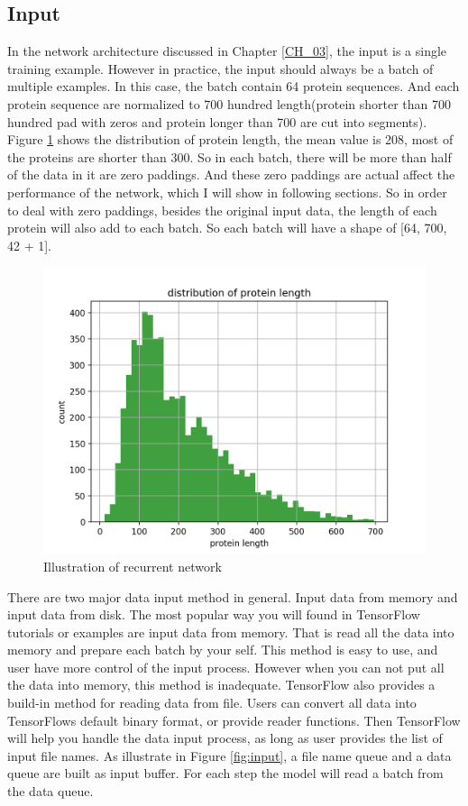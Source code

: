 \subsection{Input}
In the network architecture discussed in Chapter \ref{CH_03}, the input is a single training example. However in practice, the input should always be a batch of multiple examples. In this case, the batch contain 64 protein sequences. And each protein sequence are normalized to 700 hundred length(protein shorter than 700 hundred pad with zeros and protein longer than 700 are cut into segments).  Figure \ref{fig:len_dist} shows the distribution of protein length, the mean value is 208, most of the proteins are shorter than 300. So in each batch, there will be more than half of the data in it are zero paddings. And these zero paddings are actual affect the performance of the network, which I will show in following sections. So in order to deal with zero paddings, besides the original input data, the length of each protein will also add to each batch. So each batch will have a shape of [64, 700, 42 + 1].

\begin{figure}[H] 
	\centering
	\includegraphics[width=5in]{Figures/length_distribution}
	\caption[Detail inside recurrent unit]{Illustration of recurrent network}
	\label{fig:len_dist}
\end{figure}

There are two major data input method in general. Input data from memory and input data from disk. The most popular way you will found in TensorFlow tutorials or examples are input data from memory. That is read all the data into memory and prepare each batch by your self. This method is easy to use, and user have more control of the input process. However when you can not put all the data into memory, this method is inadequate. TensorFlow also provides a build-in method for reading data from file. Users can convert all data into TensorFlows default binary format, or provide reader functions. Then TensorFlow will help you handle the data input process, as long as user provides the list of input file names. As illustrate in Figure \ref{fig:input}, a file name queue and a data queue are built as input buffer. For each step the model will read a batch from the data queue. 

